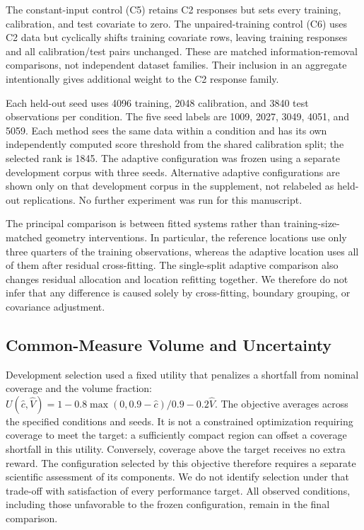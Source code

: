 \documentclass{article}
\begin{document}
The constant-input control (C5) retains C2 responses but sets every training, calibration, and test covariate to zero. The unpaired-training control (C6) uses C2 data but cyclically shifts training covariate rows, leaving training responses and all calibration/test pairs unchanged. These are matched information-removal comparisons, not independent dataset families. Their inclusion in an aggregate intentionally gives additional weight to the C2 response family.

Each held-out seed uses 4096 training, 2048 calibration, and 3840 test observations per condition. The five seed labels are 1009, 2027, 3049, 4051, and 5059. Each method sees the same data within a condition and has its own independently computed score threshold from the shared calibration split; the selected rank is 1845. The adaptive configuration was frozen using a separate development corpus with three seeds. Alternative adaptive configurations are shown only on that development corpus in the supplement, not relabeled as held-out replications. No further experiment was run for this manuscript.

The principal comparison is between fitted systems rather than training-size-matched geometry interventions. In particular, the reference locations use only three quarters of the training observations, whereas the adaptive location uses all of them after residual cross-fitting. The single-split adaptive comparison also changes residual allocation and location refitting together. We therefore do not infer that any difference is caused solely by cross-fitting, boundary grouping, or covariance adjustment.

\subsection{Common-Measure Volume and Uncertainty}
Development selection used a fixed utility that penalizes a shortfall from nominal coverage and the volume fraction: $U(\widehat c,\widehat V)=1-0.8\max(0,0.9-\widehat c)/0.9-0.2\widehat V$. The objective averages across the specified conditions and seeds. It is not a constrained optimization requiring coverage to meet the target: a sufficiently compact region can offset a coverage shortfall in this utility. Conversely, coverage above the target receives no extra reward. The configuration selected by this objective therefore requires a separate scientific assessment of its components. We do not identify selection under that trade-off with satisfaction of every performance target. All observed conditions, including those unfavorable to the frozen configuration, remain in the final comparison.
\end{document}
